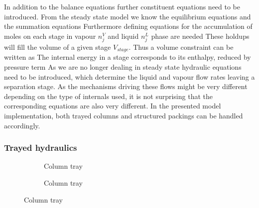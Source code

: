     In addition to the balance equations further constituent equations need to be introduced. From the
    steady state model we know the equilibrium equations
    and the summation equations
    Furthermore defining equations for the accumulation of moles on each stage in vapour $n_j^V$ and
    liquid $n_j^L$ phase are needed
    These holdups will fill the volume of a given stage $V_{stage}$. Thus a volume constraint
    can be written as
    The internal energy in a stage corresponds to its enthalpy, reduced by pressure term
    As we are no longer dealing in steady state hydraulic equations need to be introduced,
    which determine the liquid and vapour flow rates leaving a separation stage. As the
    mechanisms driving these flows might be very different depending on the type of internals
    used, it is not surprising that the corresponding equations are also very different. In the
    presented model implementation, both trayed columns and structured packings can be handled accordingly.

    \subsubsection{Trayed hydraulics}
    \label{sec:mathpro:dynamic:trayhyd}
        \begin{figure}
            \center
            \begin{subfigure}{0.46\textwidth}
                \center
                
                \caption{Column tray}
                \label{fig:col_tray}
            \end{subfigure}
            \begin{subfigure}{0.46\textwidth}
                \center
                
                \caption{Column tray}
                \label{fig:col_tray}
            \end{subfigure}
        \end{figure}

